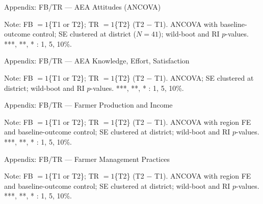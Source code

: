\documentclass[aspectratio=169]{beamer}
\newcommand{\notefont}{\fontsize{5pt}{6pt}\selectfont}
\begin{document}
\begin{frame}{Appendix: FB/TR --- AEA Attitudes (ANCOVA)}
	\centering
	\begin{minipage}{0.94\textwidth}
		\notefont
		Note: FB $=1$\{T1 or T2\}; TR $=1$\{T2\} (T2 $-$ T1). ANCOVA with baseline-outcome
		control; SE clustered at district ($N=41$); wild-boot and RI $p$-values. ***, **, * : 1, 5, 10\%.
	\end{minipage}
\end{frame}

\begin{frame}{Appendix: FB/TR --- AEA Knowledge, Effort, Satisfaction}
	\centering
	\begin{minipage}{0.94\textwidth}
		\notefont
		Note: FB $=1$\{T1 or T2\}; TR $=1$\{T2\} (T2 $-$ T1). ANCOVA; SE clustered at
		district; wild-boot and RI $p$-values. ***, **, * : 1, 5, 10\%.
	\end{minipage}
\end{frame}

\begin{frame}{Appendix: FB/TR --- Farmer Production and Income}
	\centering
	\begin{minipage}{0.94\textwidth}
		\notefont
		Note: FB $=1$\{T1 or T2\}; TR $=1$\{T2\} (T2 $-$ T1). ANCOVA with region FE and
		baseline-outcome control; SE clustered at district; wild-boot and RI $p$-values.
		***, **, * : 1, 5, 10\%.
	\end{minipage}
\end{frame}

\begin{frame}{Appendix: FB/TR --- Farmer Management Practices}
	\centering
	\begin{minipage}{0.94\textwidth}
		\notefont
		Note: FB $=1$\{T1 or T2\}; TR $=1$\{T2\} (T2 $-$ T1). ANCOVA with region FE and
		baseline-outcome control; SE clustered at district; wild-boot and RI $p$-values.
		***, **, * : 1, 5, 10\%.
	\end{minipage}
\end{frame}
\end{document}

